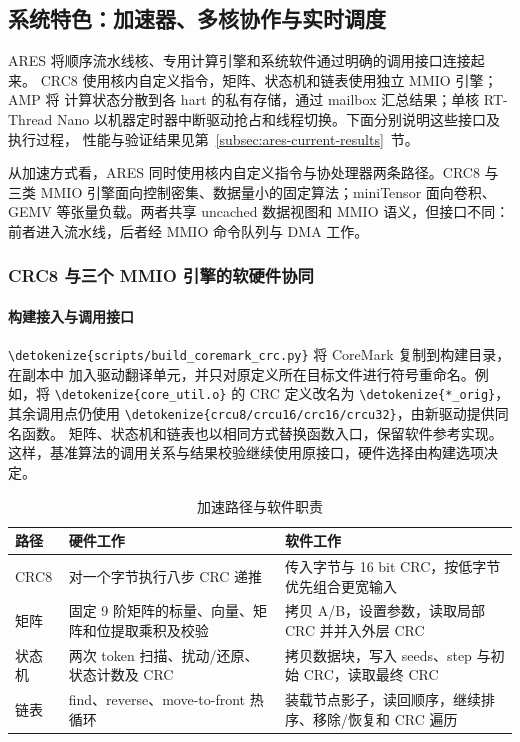 \documentclass[UTF8,a4paper,12pt,fontset=none,scheme=plain]{ctexart}
\newcommand{\code}[1]{\texttt{\detokenize{#1}}}
\renewcommand{\code}[1]{{\small\ttfamily\urlstyle{tt}\expandafter\nolinkurl\expandafter{\detokenize{#1}}}}
\begin{document}
\subsection{系统特色：加速器、多核协作与实时调度}
\label{subsec:system-features}

ARES 将顺序流水线核、专用计算引擎和系统软件通过明确的调用接口连接起来。
CRC8 使用核内自定义指令，矩阵、状态机和链表使用独立 MMIO 引擎；AMP 将
计算状态分散到各 hart 的私有存储，通过 mailbox 汇总结果；单核 RT-Thread
Nano 以机器定时器中断驱动抢占和线程切换。下面分别说明这些接口及执行过程，
性能与验证结果见第~\ref{subsec:ares-current-results}~节。

从加速方式看，ARES 同时使用核内自定义指令与协处理器两条路径。CRC8 与三类 MMIO 引擎面向控制密集、数据量小的固定算法；miniTensor 面向卷积、GEMV 等张量负载。两者共享 uncached 数据视图和 MMIO 语义，但接口不同：前者进入流水线，后者经 MMIO 命令队列与 DMA 工作。

\subsubsection{CRC8 与三个 MMIO 引擎的软硬件协同}
\label{subsec:accelerator-cooperation}

\paragraph{构建接入与调用接口}
\code{scripts/build_coremark_crc.py} 将 CoreMark 复制到构建目录，在副本中
加入驱动翻译单元，并只对原定义所在目标文件进行符号重命名。例如，将
\code{core_util.o} 的 CRC 定义改名为 \code{*_orig}，其余调用点仍使用
\code{crcu8/crcu16/crc16/crcu32}，由新驱动提供同名函数。
矩阵、状态机和链表也以相同方式替换函数入口，保留软件参考实现。
这样，基准算法的调用关系与结果校验继续使用原接口，硬件选择由构建选项决定。

\begin{table}[H]
\centering
\caption{加速路径与软件职责}
\label{tab:accelerator-contracts}
\begin{tabularx}{\linewidth}{@{}P{2.2cm}P{4.0cm}X@{}}
\toprule
路径 & 硬件工作 & 软件工作 \\
\midrule
CRC8 & 对一个字节执行八步 CRC 递推 & 传入字节与 16 bit CRC，按低字节优先组合更宽输入 \\
矩阵 & 固定 9 阶矩阵的标量、向量、矩阵和位提取乘积及校验 & 拷贝 A/B，设置参数，读取局部 CRC 并并入外层 CRC \\
状态机 & 两次 token 扫描、扰动/还原、状态计数及 CRC & 拷贝数据块，写入 seeds、step 与初始 CRC，读取最终 CRC \\
链表 & find、reverse、move-to-front 热循环 & 装载节点影子，读回顺序，继续排序、移除/恢复和 CRC 遍历 \\
\bottomrule
\end{tabularx}
\end{table}
\end{document}
